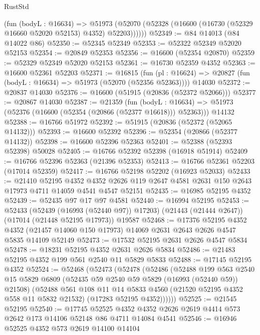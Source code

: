 \begin{lexlean}{RustStd}
\begin{coremodule}
        (fun (bodyL : @16634) =>
        @51973 (@52070 (@52328 (@16600 (@16730 (@52329 @16660 @52020 @52153) @4352) @52203))))))
@52349 := @84 @14013 (@84 @14022 @86)
@52350 := @52345 @52349
@52353 := @52322 @52349 @52020 @52153
@52354 := @20849 @52353
@52356 := @16600 (@52354 @20870)
@52359 := @52329 @52349 @52020 @52153
@52361 := @16730 @52359 @4352
@52363 := @16600 @52361 @52203
@52371 := @16815
    (fun (pl : @16624) => @20827 (fun (bodyL : @16634) => @51973 (@52070 (@52356 @52363))))
    @14030
@52372 := @20837 @14030
@52376 := @16600 (@51915 (@20836 (@52372 @52066)))
@52377 := @20867 @14030
@52387 := @21359
    (fun (bodyL : @16634) => @51973 (@52376 (@16600 (@52354 (@20866 (@52377 @16618))) @52363)))
    @14132
@52388 := @16766 @51972
@52392 := @51915 (@20836 (@52372 (@52065 @14132)))
@52393 := @16600 @52392
@52396 := @52354 (@20866 (@52377 @14132))
@52398 := @16600 @52396 @52363
@52401 := @52388 (@52393 @52398) @50028
@52405 := @16766 @52392 @52398 (@16918 @51914)
@52409 := @16766 @52396 @52363 (@21396 @52353)
@52413 := @16766 @52361 @52203 (@17014 @52359)
@52417 := @16766 @52198 @52202 (@16923 @52033)
@52433 := @21410
    @52195
    @4352
    @4352
    @2626
    @119
    @2647
    @4581
    @2631
    @150
    @2643
    @17973
    @4711
    @14059
    @4541
    @4547
    @52151
@52435 := @16985 @52195 @4352
@52439 := @52435 @97 @17 @97 @4581
@52440 := @16994 @52195
@52453 := @52433
    (@52439 (@16993 (@52440 @97)) @17203)
    (@21443 (@21444 @2647))
    (@17014 (@21448 @52195 @17973))
    @19587
@52468 := @17376
    @52195
    @4352
    @4352
    (@21457 @14060 @150 @17973)
    @14069
    @2631
    @2643
    @2626
    @4547
    @5835
    @14109
    @52149
@52473 := @17532 @52195 @2631 @2626 @4547 @5834
@52478 := @18231 @52195 @4352 @2631 @2626 @5834
@52486 := @21483 @52195 @4352 @199 @561 @2540 @11 @5829 @5833
@52488 := @17145 @52195 @4352
@52524 := @52468
    (@52473
      (@52478
        (@52486
          (@52488
            @199
            @563
            @2540
            @15
            @5829
            @6809
            (@52435 @59 @2540 @59 @5829 (@16993 (@52440 @59)) @21508)
            (@52488
              @561
              @108
              @11
              @14
              @5833
              @4560
              (@21520 @52195 @4352 @558 @11 @5832 @21532)
              (@17283 @52195 @4352))))))
@52525 := @21545 @52195
@52540 := @17745
    @52525
    @4352
    @4352
    @2626
    @2619
    @4414
    @573
    @2642
    @173
    @14106
    @52148
    @86
    @4711
    @14084
    @4541
@52546 := @16946 @52525 @4352 @573 @2619 @14100 @14104

\end{coremodule}
\end{lexlean}
